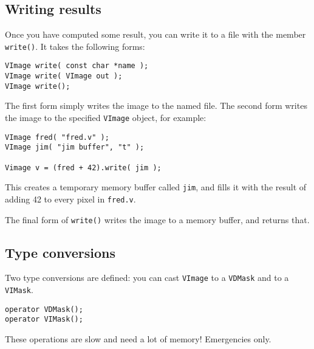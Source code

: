 \subsection{Writing results}

Once you have computed some result, you can write it to a file with the member
\verb+write()+. It takes the following forms:

\begin{verbatim}
VImage write( const char *name );
VImage write( VImage out );
VImage write();
\end{verbatim}

The first form simply writes the image to the named file. The second form
writes the image to the specified \verb+VImage+ object, for example:

\begin{verbatim}
VImage fred( "fred.v" );
VImage jim( "jim buffer", "t" );

Vimage v = (fred + 42).write( jim );
\end{verbatim}

\noindent
This creates a temporary memory buffer called \verb+jim+, and fills it with
the result of adding 42 to every pixel in \verb+fred.v+.

The final form of \verb+write()+ writes the image to a memory buffer, and
returns that.

\subsection{Type conversions}

Two type conversions are defined: you can cast \verb+VImage+ to a
\verb+VDMask+ and to a \verb+VIMask+.

\begin{verbatim}
operator VDMask();
operator VIMask();
\end{verbatim}

These operations are slow and need a lot of memory! Emergencies only.
